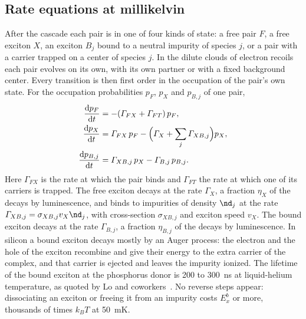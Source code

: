 \subsection{Rate equations at millikelvin}\label{sec:18.5-kinetics}

After the cascade each pair is in one of four kinds of state: a free pair $F$, a free exciton $X$, an exciton $B_j$ bound to a neutral impurity of species $j$, or a pair with a carrier trapped on a center of species $j$. In the dilute clouds of electron recoils each pair evolves on its own, with its own partner or with a fixed background center. Every transition is then first order in the occupation of the pair's own state. For the occupation probabilities $p_F$, $p_X$ and $p_{B,j}$ of one pair,
\begin{equation}
  \begin{aligned}
    \frac{\mathrm{d} p_F}{\mathrm{d} t} &= -(\varGamma_{FX} + \varGamma_{FT})\,p_F , \\
    \frac{\mathrm{d} p_X}{\mathrm{d} t} &= \varGamma_{FX}\,p_F - \Bigl(\varGamma_X + \sum_j\varGamma_{XB,j}\Bigr)p_X , \\
    \frac{\mathrm{d} p_{B,j}}{\mathrm{d} t} &= \varGamma_{XB,j}\,p_X - \varGamma_{B,j}\,p_{B,j} .
  \end{aligned}
  \label{eq:18.5-rates}
\end{equation}
Here $\varGamma_{FX}$ is the rate at which the pair binds and $\varGamma_{FT}$ the rate at which one of its carriers is trapped. The free exciton decays at the rate $\varGamma_X$, a fraction $\eta_X$ of the decays by luminescence, and binds to impurities of density $\nd_j$ at the rate $\varGamma_{XB,j} = \sigma_{XB,j}v_X\nd_j$, with cross-section $\sigma_{XB,j}$ and exciton speed $v_X$. The bound exciton decays at the rate $\varGamma_{B,j}$, a fraction $\eta_{B,j}$ of the decays by luminescence. In silicon a bound exciton decays mostly by an Auger process: the electron and the hole of the exciton recombine and give their energy to the extra carrier of the complex, and that carrier is ejected and leaves the impurity ionized. The lifetime of the bound exciton at the phosphorus donor is 200 to \SI{300}{ns} at liquid-helium temperature, as quoted by Lo and coworkers~\cite{lo2015hybrid}. No reverse steps appear: dissociating an exciton or freeing it from an impurity costs $E_x^b$ or more, thousands of times $k_BT$ at \SI{50}{mK}.

